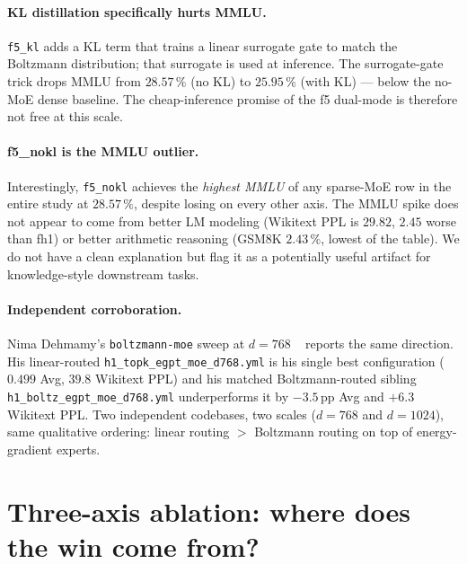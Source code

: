 \documentclass[oneside]{article}
\begin{document}
\paragraph{KL distillation specifically hurts MMLU.}
\texttt{f5\_kl} adds a KL term that trains a linear surrogate gate to
match the Boltzmann distribution; that surrogate is used at inference.
The surrogate-gate trick drops MMLU from $28.57\,\%$ (no KL) to
$25.95\,\%$ (with KL) --- below the no-MoE dense baseline. The
cheap-inference promise of the f5 dual-mode is therefore not free at
this scale.

\paragraph{f5\_nokl is the MMLU outlier.}
Interestingly, \texttt{f5\_nokl} achieves the \emph{highest MMLU} of
any sparse-MoE row in the entire study at $28.57\,\%$, despite losing
on every other axis. The MMLU spike does not appear to come from
better LM modeling (Wikitext PPL is $29.82$, $2.45$ worse than fh1) or
better arithmetic reasoning (GSM8K $2.43\,\%$, lowest of the table).
We do not have a clean explanation but flag it as a potentially
useful artifact for knowledge-style downstream tasks.

\paragraph{Independent corroboration.}
Nima Dehmamy's \texttt{boltzmann-moe} sweep at $d{=}768$
~\citep{dehmamy2026boltzmoe} reports the same direction. His
linear-routed \texttt{h1\_topk\_egpt\_moe\_d768.yml} is his single
best configuration ($0.499$ Avg, $39.8$ Wikitext PPL) and his matched
Boltzmann-routed sibling \texttt{h1\_boltz\_egpt\_moe\_d768.yml}
underperforms it by $-3.5\,$pp Avg and $+6.3$ Wikitext PPL. Two
independent codebases, two scales ($d{=}768$ and $d{=}1024$), same
qualitative ordering: linear routing $>$ Boltzmann routing on top of
energy-gradient experts.


\section{Three-axis ablation: where does the win come from?}
\label{sec:abl}
\end{document}
